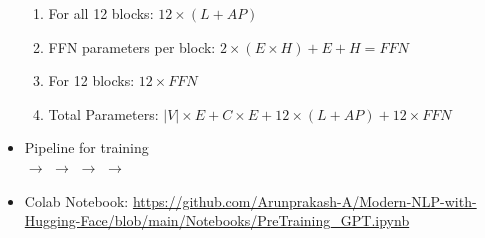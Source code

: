 \documentclass[a4paper]{article}
\begin{document}
\begin{itemize}
\begin{enumerate}
        \item For all 12 blocks: $12\times(L+AP)$
        \item FFN parameters per block: $2\times(E\times H)+E+H=FFN$
        \item For 12 blocks: $12\times FFN$
        \item Total Parameters: $|V|\times E+C\times E+12\times(L+AP)+12\times FFN$
    \end{enumerate}
    \item Pipeline for training\\
     $\to$  $\to$  $\to$  $\to$ 
    \item Colab Notebook: \url{https://github.com/Arunprakash-A/Modern-NLP-with-Hugging-Face/blob/main/Notebooks/PreTraining_GPT.ipynb}
\end{itemize}
\end{document}
